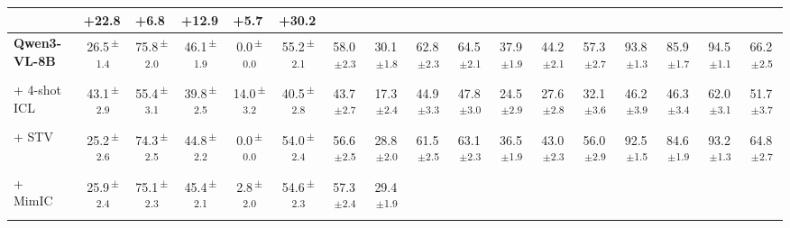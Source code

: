 \documentclass[sigconf,review,anonymous,9pt,table]{acmart}
\begin{document}
\begin{table}[t]
{\begin{tabular}{@{}l
  c c
  c c c c c
  c c c c
  c c c c c
  @{}}
  & \multicolumn{1}{l}{\textcolor{mygreen}{+22.8}} & \multicolumn{1}{l}{\textcolor{mygreen}{+6.8}} & \multicolumn{1}{l}{\textcolor{mygreen}{+12.9}} & \multicolumn{1}{l}{\textcolor{mygreen}{+5.7}} & \multicolumn{1}{l}{\textcolor{mygreen}{+30.2}} \\
\midrule
\textbf{Qwen3-VL-8B}
  & 26.5\textsuperscript{\,$\pm$1.4} & 75.8\textsuperscript{\,$\pm$2.0} & 46.1\textsuperscript{\,$\pm$1.9} & 0.0\textsuperscript{\,$\pm$0.0} & 55.2\textsuperscript{\,$\pm$2.1} & 58.0\textsuperscript{\,$\pm$2.3} & 30.1\textsuperscript{\,$\pm$1.8}
  & 62.8\textsuperscript{\,$\pm$2.3} & 64.5\textsuperscript{\,$\pm$2.1} & 37.9\textsuperscript{\,$\pm$1.9} & 44.2\textsuperscript{\,$\pm$2.1}
  & 57.3\textsuperscript{\,$\pm$2.7} & 93.8\textsuperscript{\,$\pm$1.3} & 85.9\textsuperscript{\,$\pm$1.7} & 94.5\textsuperscript{\,$\pm$1.1} & 66.2\textsuperscript{\,$\pm$2.5} \\
+ 4-shot ICL
  & 43.1\textsuperscript{\,$\pm$2.9} & 55.4\textsuperscript{\,$\pm$3.1} & 39.8\textsuperscript{\,$\pm$2.5} & 14.0\textsuperscript{\,$\pm$3.2} & 40.5\textsuperscript{\,$\pm$2.8} & 43.7\textsuperscript{\,$\pm$2.7} & 17.3\textsuperscript{\,$\pm$2.4}
  & 44.9\textsuperscript{\,$\pm$3.3} & 47.8\textsuperscript{\,$\pm$3.0} & 24.5\textsuperscript{\,$\pm$2.9} & 27.6\textsuperscript{\,$\pm$2.8}
  & 32.1\textsuperscript{\,$\pm$3.6} & 46.2\textsuperscript{\,$\pm$3.9} & 46.3\textsuperscript{\,$\pm$3.4} & 62.0\textsuperscript{\,$\pm$3.1} & 51.7\textsuperscript{\,$\pm$3.7} \\
+ STV~\cite{ma2026and}
  & 25.2\textsuperscript{\,$\pm$2.6} & 74.3\textsuperscript{\,$\pm$2.5} & 44.8\textsuperscript{\,$\pm$2.2} & 0.0\textsuperscript{\,$\pm$0.0} & 54.0\textsuperscript{\,$\pm$2.4} & 56.6\textsuperscript{\,$\pm$2.5} & 28.8\textsuperscript{\,$\pm$2.0}
  & 61.5\textsuperscript{\,$\pm$2.5} & 63.1\textsuperscript{\,$\pm$2.3} & 36.5\textsuperscript{\,$\pm$1.9} & 43.0\textsuperscript{\,$\pm$2.3}
  & 56.0\textsuperscript{\,$\pm$2.9} & 92.5\textsuperscript{\,$\pm$1.5} & 84.6\textsuperscript{\,$\pm$1.9} & 93.2\textsuperscript{\,$\pm$1.3} & 64.8\textsuperscript{\,$\pm$2.7} \\
+ MimIC~\cite{jiang2025mimic}
  & 25.9\textsuperscript{\,$\pm$2.4} & 75.1\textsuperscript{\,$\pm$2.3} & 45.4\textsuperscript{\,$\pm$2.1} & 2.8\textsuperscript{\,$\pm$2.0} & 54.6\textsuperscript{\,$\pm$2.3} & 57.3\textsuperscript{\,$\pm$2.4} & 29.4\textsuperscript{\,$\pm$1.9}

\end{tabular}}
\end{table}
\end{document}
